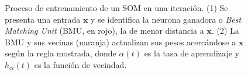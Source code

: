 \begin{figure}[H]
\caption{Proceso de entrenamiento de un SOM en una iteración. (1) Se presenta
una entrada $\bm{x}$ y se identifica la neurona ganadora o \textit{Best Matching
Unit} (BMU, en rojo), la de menor distancia a $\bm{x}$. (2) La BMU y sus
vecinas (naranja) actualizan sus pesos acercándose a $\bm{x}$ según la regla
mostrada, donde $\alpha(t)$ es la tasa de aprendizaje y $h_{ci}(t)$ es la
función de vecindad.}
\label{fig:som_proceso}
\end{figure}
